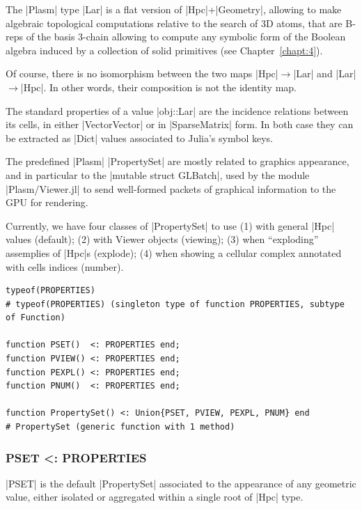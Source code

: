 \begin{coding}
The |Plasm| type |Lar| is a flat version of |Hpc|+|Geometry|, allowing to make algebraic topological computations relative to the search of 3D atoms, that are B-reps of the basis  3-chain allowing to compute any symbolic form of the Boolean algebra induced by a collection of solid primitives (see Chapter~\ref{chapt:4}). 

Of course, there is no isomorphism between the two maps |Hpc|$\to$|Lar| and |Lar|$\to$|Hpc|.  In other words, their composition is not the identity map.

The standard properties of a value |obj::Lar| are the incidence relations between its cells, in either |Vector{Vector}| or in |SparseMatrix| form. In both case they can be extracted as |Dict| values associated to Julia’s symbol keys.


The predefined |Plasm| |PropertySet| are mostly related to graphics appearance, and in particular to the |mutable struct GLBatch|, used  by the module |Plasm/Viewer.jl| to send well-formed packets of graphical information to the GPU for rendering.

\begin{definition}
Currently, we have four classes of |PropertySet| to use (1) with general |Hpc| values (default); (2) with {\sf Viewer} objects (viewing); (3) when “exploding” assemplies of |Hpc|s (explode); (4) when showing a cellular complex annotated with cells indices (number).
\end{definition}

\begin{lstlisting}[language=JuliaLocal, style=julia, mathescape=true]
typeof(PROPERTIES)
# typeof(PROPERTIES) (singleton type of function PROPERTIES, subtype of Function)

function PSET()  <: PROPERTIES end;
function PVIEW() <: PROPERTIES end;
function PEXPL() <: PROPERTIES end;
function PNUM()  <: PROPERTIES end;

function PropertySet() <: Union{PSET, PVIEW, PEXPL, PNUM} end 
# PropertySet (generic function with 1 method)
\end{lstlisting}

\subsubsection*{\small\sf PSET <: PROPERTIES}\label{4-4-3-1}

|PSET| is the default |PropertySet| associated to the appearance of any geometric value, either isolated or aggregated within a single root of |Hpc| type. 



\end{coding}
